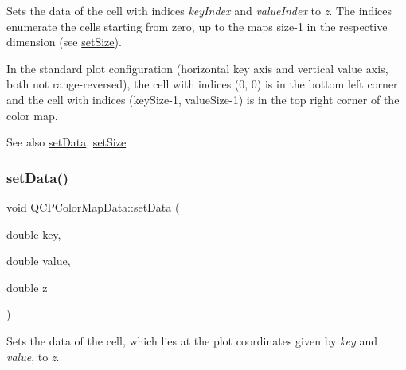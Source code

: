 Sets the data of the cell with indices {\itshape key\+Index} and {\itshape value\+Index} to {\itshape z}. The indices enumerate the cells starting from zero, up to the map\textquotesingle{}s size-\/1 in the respective dimension (see \mbox{\hyperlink{class_q_c_p_color_map_data_a0d9ff35c299d0478b682bfbcdd9c097e}{set\+Size}}).

In the standard plot configuration (horizontal key axis and vertical value axis, both not range-\/reversed), the cell with indices (0, 0) is in the bottom left corner and the cell with indices (key\+Size-\/1, value\+Size-\/1) is in the top right corner of the color map.

\begin{DoxySeeAlso}{See also}
\mbox{\hyperlink{class_q_c_p_color_map_data_afd2083ccfd6987ec94aa7ef8e91ca39a}{set\+Data}}, \mbox{\hyperlink{class_q_c_p_color_map_data_a0d9ff35c299d0478b682bfbcdd9c097e}{set\+Size}} 
\end{DoxySeeAlso}
\mbox{\label{class_q_c_p_color_map_data_afd2083ccfd6987ec94aa7ef8e91ca39a}} 
\subsubsection{\texorpdfstring{set\+Data()}{setData()}}
{\footnotesize\ttfamily void Q\+C\+P\+Color\+Map\+Data\+::set\+Data (\begin{DoxyParamCaption}\item[{double}]{key,  }\item[{double}]{value,  }\item[{double}]{z }\end{DoxyParamCaption})}

Sets the data of the cell, which lies at the plot coordinates given by {\itshape key} and {\itshape value}, to {\itshape z}.

